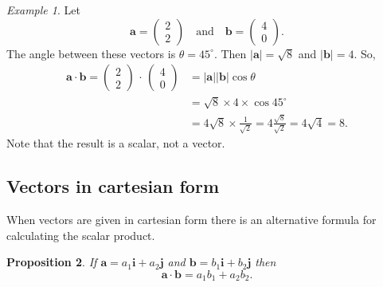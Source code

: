 \documentclass[12pt,a4paper]{article}
\newtheorem{proposition}{Proposition}[section]
\theoremstyle{definition}
\theoremstyle{remark}
\newtheorem{example}[proposition]{Example}
\newcommand{\bvec}[1]{\mathrm{\mathbf{#1}}}
\newcommand{\cvec}[2]{\begin{pmatrix} #1 \\ #2 \end{pmatrix}}
\newcommand{\vmod}[1]{{\lvert {#1} \rvert}}
\begin{document}
\begin{example}
Let 
\[
\bvec{a} = \cvec{2}{2} \quad \text{and} \quad \bvec{b} = \cvec{4}{0}.
\]
The angle between these vectors is \(\theta = {45}^{\circ}\). Then \(\vmod{\bvec{a}} = \sqrt{8} \) and \(\vmod{\bvec{b}} = 4\). So, 
\begin{align*}
\bvec{a} \cdot \bvec{b} = \cvec{2}{2}\,\cdot\, \cvec{4}{0} &= \vmod{\bvec{a}}\vmod{\bvec{b}}\cos\theta \\
\,&= \sqrt{8} \times 4 \times \cos {45}^{\circ} \\
\,&= 4\sqrt{8}\times \frac{1}{\sqrt{2}} = 4\frac{\sqrt{8}}{\sqrt{2}} = 4\sqrt{4} = 8.
\end{align*} 
Note that the result is a scalar, not a vector. 
\end{example}

\subsection{Vectors in cartesian form}

When vectors are given in cartesian form there is an alternative formula for calculating the scalar product. 
\begin{proposition}
If \(\bvec{a} = a_1\bvec{i} + a_2\bvec{j}\) and \(\bvec{b} = b_1\bvec{i} + b_2\bvec{j}\) then
\[
\bvec{a} \cdot \bvec{b} = a_1b_1 + a_2b_2.
\]
\end{proposition}
\end{document}
